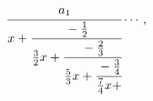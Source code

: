 \[\cfrac{a_{1}}{x+\cfrac{-\frac{1}{2}}{\frac{3}{2}x+\cfrac{-\frac{2}{3}}{\frac{5%
}{3}x+\cfrac{-\frac{3}{4}}{\frac{7}{4}x+}}}}\cdots,\]